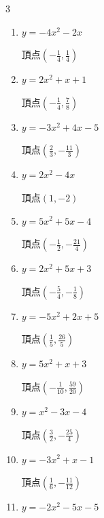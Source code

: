 \begin{multicols}{3}
\begin{enumerate}
        $\displaystyle 頂点\left( \frac{1}{2} , \frac{11}{4} \right)$

  \item $\displaystyle y=-4x^{2}-2x$

        $\displaystyle 頂点\left( -\frac{1}{4} , \frac{1}{4} \right)$

  \item $\displaystyle y=2x^{2}+x+1$

        $\displaystyle 頂点\left( -\frac{1}{4} , \frac{7}{8} \right)$

  \item $\displaystyle y=-3x^{2}+4x-5$

        $\displaystyle 頂点\left( \frac{2}{3} , -\frac{11}{3} \right)$

  \item $\displaystyle y=2x^{2}-4x$

        $\displaystyle 頂点\left( 1 , -2 \right)$

\columnbreak %

\resetques

  \item $\displaystyle y=5x^{2}+5x-4$

        $\displaystyle 頂点\left( -\frac{1}{2} , -\frac{21}{4} \right)$

  \item $\displaystyle y=2x^{2}+5x+3$

        $\displaystyle 頂点\left( -\frac{5}{4} , -\frac{1}{8} \right)$

  \item $\displaystyle y=-5x^{2}+2x+5$

        $\displaystyle 頂点\left( \frac{1}{5} , \frac{26}{5} \right)$

  \item $\displaystyle y=5x^{2}+x+3$

        $\displaystyle 頂点\left( -\frac{1}{10} , \frac{59}{20} \right)$

  \item $\displaystyle y=x^{2}-3x-4$

        $\displaystyle 頂点\left( \frac{3}{2} , -\frac{25}{4} \right)$

\columnbreak %

  \item $\displaystyle y=-3x^{2}+x-1$

        $\displaystyle 頂点\left( \frac{1}{6} , -\frac{11}{12} \right)$

  \item $\displaystyle y=-2x^{2}-5x-5$


\end{enumerate}
\end{multicols}
